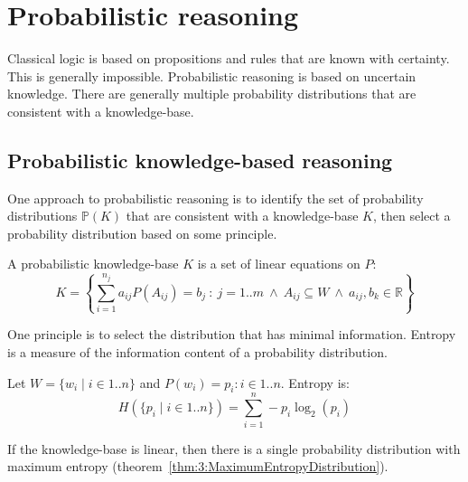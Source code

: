 \section{Probabilistic reasoning}

Classical logic is based on propositions and rules that are known with certainty.
This is generally impossible.
Probabilistic reasoning is based on uncertain knowledge.
There are generally multiple probability distributions that are consistent with
a knowledge-base.

\subsection{Probabilistic knowledge-based reasoning}

One approach to probabilistic reasoning is to identify the set of probability
distributions $\mathbb{P}(K)$ that are consistent with a knowledge-base $K$,
then select a probability distribution based on some principle.

\begin{dfn}
  A probabilistic knowledge-base $K$ is a set of linear equations on $P$:
  \begin{equation}
    K = \left\{
    \sum_{i = 1}^{n_j}a_{ij} P(A_{ij}) = b_j
    \ :\
    j = 1 .. m
    \ \land \
    A_{ij}\subseteq W
    \ \land \
    a_{ij},b_k \in\mathbb{R}
    \right\}
  \end{equation}
\end{dfn}

One principle is to select the distribution that has minimal information.
Entropy is a measure of the information content of a probability distribution.

\begin{dfn}
  [Entropy]
  Let $W = \{w_i \mid i \in 1 .. n\}$ and $P(w_i) = p_i : i \in 1 .. n$.
  Entropy is:
  \begin{equation}
    H(\{p_i \mid i \in 1 .. n\}) = \sum_{i = 1}^{n} - p_i \log_2(p_i)
  \end{equation}
\end{dfn}

If the knowledge-base is linear, then there is a single probability distribution
with maximum entropy (theorem~\ref{thm:3:MaximumEntropyDistribution}).


